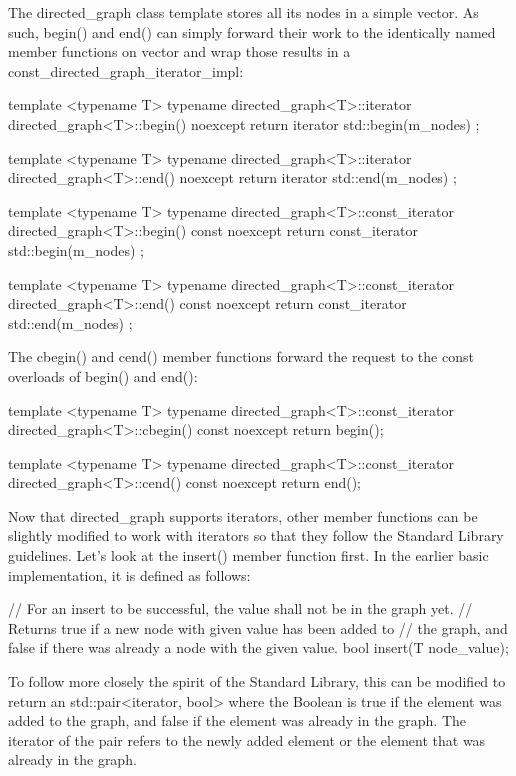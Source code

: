 The directed\_graph class template stores all its nodes in a simple vector. As such, begin() and end() can simply forward their work to the identically named member functions on vector and wrap those results in a const\_directed\_graph\_iterator\_impl:

\begin{cpp}
template <typename T>
typename directed_graph<T>::iterator
    directed_graph<T>::begin() noexcept { return iterator{ std::begin(m_nodes) }; }

template <typename T>
typename directed_graph<T>::iterator
    directed_graph<T>::end() noexcept { return iterator { std::end(m_nodes) }; }

template <typename T>
typename directed_graph<T>::const_iterator
    directed_graph<T>::begin() const noexcept
{ return const_iterator { std::begin(m_nodes) }; }

template <typename T>
typename directed_graph<T>::const_iterator
    directed_graph<T>::end() const noexcept
{ return const_iterator { std::end(m_nodes) }; }
\end{cpp}

The cbegin() and cend() member functions forward the request to the const overloads of begin() and end():

\begin{cpp}
template <typename T>
typename directed_graph<T>::const_iterator
    directed_graph<T>::cbegin() const noexcept { return begin(); }

template <typename T>
typename directed_graph<T>::const_iterator
    directed_graph<T>::cend() const noexcept { return end(); }
\end{cpp}


Now that directed\_graph supports iterators, other member functions can be slightly modified to work with iterators so that they follow the Standard Library guidelines. Let’s look at the insert() member function first. In the earlier basic implementation, it is defined as follows:

\begin{cpp}
// For an insert to be successful, the value shall not be in the graph yet.
// Returns true if a new node with given value has been added to // the graph, and false if there was already a node with the given value.
bool insert(T node_value);
\end{cpp}

To follow more closely the spirit of the Standard Library, this can be modified to return an std::pair<iterator, bool> where the Boolean is true if the element was added to the graph, and false if the element was already in the graph. The iterator of the pair refers to the newly added element or the element that was already in the graph.

